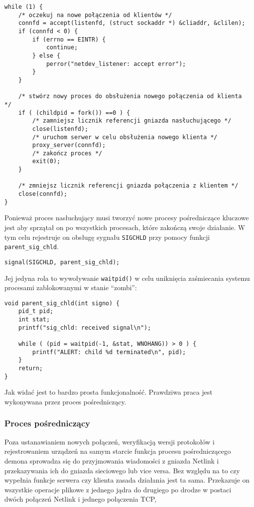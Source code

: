 \begin{verbatim}
while (1) {
    /* oczekuj na nowe połączenia od klientów */
    connfd = accept(listenfd, (struct sockaddr *) &cliaddr, &clilen);
    if (connfd < 0) {
        if (errno == EINTR) {
            continue;
        } else {
            perror("netdev_listener: accept error");
        }
    }

    /* stwórz nowy proces do obsłużenia nowego połączenia od klienta */
    if ( (childpid = fork()) ==0 ) {
        /* zamniejsz licznik referencji gniazda nasłuchującego */
        close(listenfd);
        /* uruchom serwer w celu obsłużenia nowego klienta */
        proxy_server(connfd);
        /* zakończ proces */
        exit(0);
    }

    /* zmniejsz licznik referencji gniazda połączenia z klientem */
    close(connfd);
}
\end{verbatim}

Ponieważ proces nasłuchujący musi tworzyć nowe procesy pośredniczące
kluczowe jest aby sprzątał on po wszystkich procesach, które zakończą
swoje działanie. W tym celu rejestruje on obsługę sygnału
\texttt{SIGCHLD} przy pomocy funkcji \texttt{parent\_sig\_chld}.

\begin{verbatim}
signal(SIGCHLD, parent_sig_chld);
\end{verbatim}

Jej jedyna rola to wywoływanie \texttt{waitpid()} w celu uniknięcia
zaśmiecania systemu procesami zablokowanymi w stanie ``zombi'':

\begin{verbatim}
void parent_sig_chld(int signo) {
    pid_t pid;
    int stat;
    printf("sig_chld: received signal\n");

    while ( (pid = waitpid(-1, &stat, WNOHANG)) > 0 ) {
        printf("ALERT: child %d terminated\n", pid);
    }
    return;
}
\end{verbatim}

Jak widać jest to bardzo prosta funkcjonalność. Prawdziwa praca jest
wykonywana przez proces pośredniczący.

\subsubsection{Proces pośredniczący}

Poza ustanawianiem nowych połączeń, weryfikacją wersji protokołów i
rejestrowaniem urządzeń na samym starcie funkcja procesu pośredniczącego
demona sprowadza się do przyjmowania wiadomości z gniazda Netlink i
przekazywania ich do gniazda sieciowego lub vice versa. Bez względu na
to czy wypełnia funkcje serwera czy klienta zasada działania jest ta
sama. Przekazuje on wszystkie operacje plikowe z jednego jądra do
drugiego po drodze w postaci dwóch połączeń Netlink i jednego połączenia
TCP,

